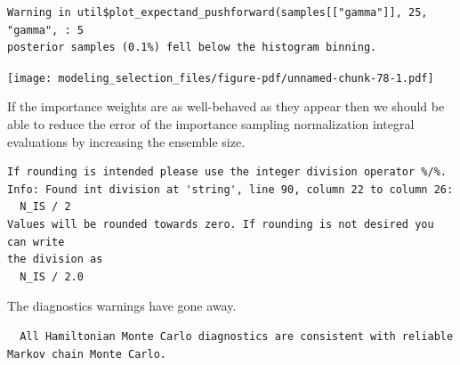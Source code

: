 \documentclass[
  letterpaper,
  DIV=11,
  numbers=noendperiod]{scrartcl}
\newenvironment{Shaded}{\begin{snugshade}}{\end{snugshade}}
\newcommand{\AttributeTok}[1]{\textcolor[rgb]{0.40,0.45,0.13}{#1}}
\newcommand{\DecValTok}[1]{\textcolor[rgb]{0.68,0.00,0.00}{#1}}
\newcommand{\FunctionTok}[1]{\textcolor[rgb]{0.28,0.35,0.67}{#1}}
\newcommand{\NormalTok}[1]{\textcolor[rgb]{0.00,0.23,0.31}{#1}}
\newcommand{\OtherTok}[1]{\textcolor[rgb]{0.00,0.23,0.31}{#1}}
\newcommand{\SpecialCharTok}[1]{\textcolor[rgb]{0.37,0.37,0.37}{#1}}
\newcommand{\StringTok}[1]{\textcolor[rgb]{0.13,0.47,0.30}{#1}}
\begin{document}
\begin{verbatim}
Warning in util$plot_expectand_pushforward(samples[["gamma"]], 25, "gamma", : 5
posterior samples (0.1%) fell below the histogram binning.
\end{verbatim}

\texttt{[image: modeling\_selection\_files/figure-pdf/unnamed-chunk-78-1.pdf]}

If the importance weights are as well-behaved as they appear then we
should be able to reduce the error of the importance sampling
normalization integral evaluations by increasing the ensemble size.

\begin{Shaded}
\end{Shaded}

\begin{verbatim}
If rounding is intended please use the integer division operator %/%.
Info: Found int division at 'string', line 90, column 22 to column 26:
  N_IS / 2
Values will be rounded towards zero. If rounding is not desired you can write
the division as
  N_IS / 2.0
\end{verbatim}

The diagnostics warnings have gone away.

\begin{Shaded}
\end{Shaded}

\begin{verbatim}
  All Hamiltonian Monte Carlo diagnostics are consistent with reliable
Markov chain Monte Carlo.
\end{verbatim}
\end{document}
